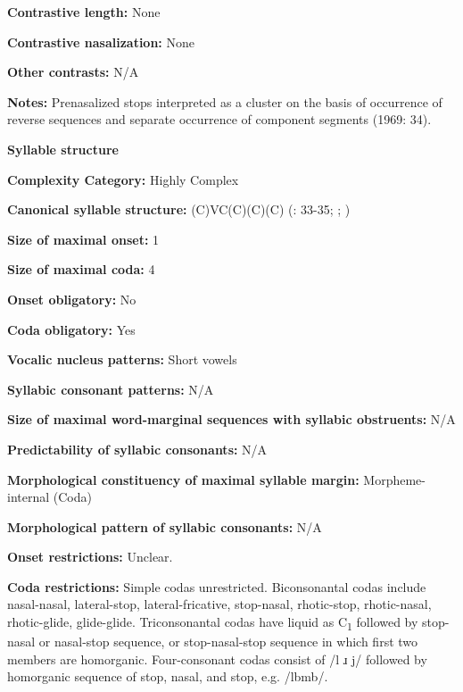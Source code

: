 \textbf{Contrastive length:} None



\textbf{Contrastive nasalization:} None



\textbf{Other contrasts:} N/A



\textbf{Notes:} Prenasalized stops interpreted as a cluster on the basis of occurrence of reverse sequences and separate occurrence of component segments (1969: 34).



\textbf{Syllable structure}



\textbf{Complexity Category:} Highly Complex



\textbf{Canonical syllable structure:} (C)VC(C)(C)(C) (\citealt{Summer1969}: 33-35; \citealt{Sommer1981}; \citealt{Dixon1970})



\textbf{Size of maximal onset:} 1



\textbf{Size of maximal coda:} 4



\textbf{Onset obligatory:} No



\textbf{Coda obligatory:} Yes



\textbf{Vocalic nucleus patterns:} Short vowels



\textbf{Syllabic consonant patterns:} N/A



\textbf{Size of maximal word{}-marginal sequences with syllabic obstruents:} N/A



\textbf{Predictability of syllabic consonants:} N/A



\textbf{Morphological constituency of maximal syllable margin:} Morpheme-internal (Coda)



\textbf{Morphological pattern of syllabic consonants:} N/A



\textbf{Onset restrictions:} Unclear.



\textbf{Coda restrictions:} Simple codas unrestricted. Biconsonantal codas include nasal-nasal, lateral-stop, lateral-fricative, stop-nasal, rhotic-stop, rhotic-nasal, rhotic-glide, glide-glide. Triconsonantal codas have liquid as C\textsubscript{1} followed by stop-nasal or nasal-stop sequence, or stop-nasal-stop sequence in which first two members are homorganic. Four-consonant codas consist of /l ɹ j/ followed by homorganic sequence of stop, nasal, and stop, e.g. /lbmb/.



